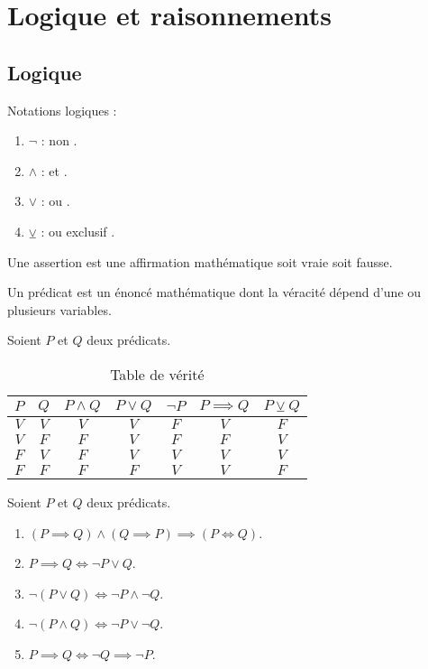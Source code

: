\chapter{Logique et raisonnements}
\def\arraystretch{1.5}
\section{Logique}
\noindent Notations logiques :
\begin{enumerate}
	\item $\neg$ : \og non \fg.
	\item $\land$ : \og et \fg.
	\item $\lor$ : \og ou \fg.
	\item $\veebar$ : \og ou exclusif \fg.
\end{enumerate}

\begin{definition}[Assertion]
  Une assertion est une affirmation mathématique soit vraie soit fausse.
\end{definition}

\begin{definition}[Prédicat]
  Un prédicat est un énoncé mathématique dont la véracité dépend d'une ou plusieurs variables.
\end{definition}

Soient $P$ et $Q$ deux prédicats.
\begin{table}[!h]
	\centering
	\begin{tabular}{ccccccc}
		\toprule
		$P$ & $Q$ & $P \land Q$ & $P \lor Q$ & $\neg P$ & $P \implies Q$ & $P \veebar Q$ \\
		\midrule
		$V$ & $V$ & $V$ & $V$ & $F$ & $V$ & $F$ \\
		$V$ & $F$ & $F$ & $V$ & $F$ & $F$ & $V$ \\
		$F$ & $V$ & $F$ & $V$ & $V$ & $V$ & $V$ \\
		$F$ & $F$ & $F$ & $F$ & $V$ & $V$ & $F$ \\
		\bottomrule
	\end{tabular}
	\caption{Table de vérité}
\end{table}

\begin{proposition}
  Soient $P$ et $Q$ deux prédicats.  
	\begin{enumerate} 
		\item $(P \implies Q) \land (Q \implies P) \implies (P \iff Q)$.
		\item $P \implies Q \iff \neg P \lor Q$.
		\item $\neg (P \lor Q) \iff \neg P \land \neg Q$.
		\item $\neg (P \land Q) \iff \neg P \lor \neg Q$.
		\item $P \implies Q \iff \neg Q \implies \neg P$.
	\end{enumerate}
\end{proposition}

